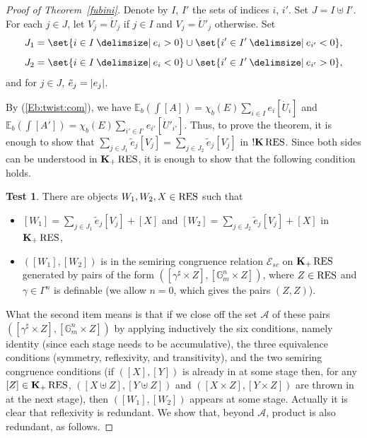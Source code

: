 \documentclass[12pt]{amsart}
\theoremstyle{plain}
\theoremstyle{definition}
\newtheorem{test}[thm]{Test}
\theoremstyle{remark}
\numberwithin{equation}{section}
\theoremstyle{plain}
\newcommand{\G}{\mathds{G}}
\newcommand{\0}{\emptyset}
\DeclarePairedDelimiter\abs{\lvert}{\rvert}
\newcommand{\mdl}[1]{\mathcal{#1}}  %
\newcommand{\bb}[1]{\mathbb{#1}}
\providecommand\given{}
\newcommand\SetSymbol[1][]{%
\nonscript \: #1 \vert
\allowbreak
\nonscript\:
\mathopen{}}
\renewcommand\given{\SetSymbol[\delimsize]}
\newcommand{\RES}{\textup{RES}}
\DeclareMathOperator{\gsk}{\mathbf{K}_+}
\DeclareMathOperator{\ggk}{\mathbf{K}}
\DeclareMathOperator{\sggk}{!\mathbf{K}}
\begin{document}
\begin{proof}[Proof of Theorem~\ref{fubini}]

Denote by $I$, $I'$ the sets of indices $i$, $i'$. Set $J = I \uplus I'$. For each $j\in J$, let $V_j=\dot U_j$ if $j\in I$ and $V_j=\dot U'_j$ otherwise. Set
\[
J_1=\set{i\in I \given e_i>0} \cup \set{i'\in I' \given e_{i'}<0},
\]
\[
J_2=\set{i\in I \given e_i<0}\cup \set{i'\in I'  \given e_{i'}>0},
\]
and for $j\in J$, $\tilde e_j = \abs{e_j}$.

By (\ref{Eb:twist:com}), we have $\bb E_b (\int [A] ) = \chi_b(E) \sum_{i\in I} e_i [\dot U_i]$ and $\bb E_b ( \int [A'] ) = \chi_b(E) \sum_{i'\in I'} e_{i'} [\dot U'_{i'}]$. Thus, to prove the theorem, it is enough to show that $\sum_{j\in J_1} \tilde e_j [V_j]=\sum_{j\in J_2} \tilde e_j [V_j]$ in $\sggk \RES$.  Since both sides can be understood in $\gsk \RES$, it is enough to show that the following condition holds.

\begin{test}\label{test}
There are objects $W_1, W_2, X \in \RES$ such that
\begin{itemize}
  \item $[W_1] = \sum_{j\in J_1} \tilde e_j [V_j] + [X]$ and $[W_2] = \sum_{j\in J_2} \tilde e_j [V_j] + [X]$ in $\gsk \RES$,
  \item $([W_1], [W_2])$ is in the semiring congruence relation $\mdl E_{sc}$ on $\gsk \RES$ generated by pairs of the form $([\gamma^\sharp \times Z], [\G_{m}^n \times Z])$, where $Z \in \RES$ and $\gamma \in \Gamma^n$ is definable (we allow $n = 0$, which gives the pairs $(Z, Z)$).
\end{itemize}
\end{test}

What the second item means is that  if we close off the set $\mdl A$ of these pairs $([\gamma^\sharp \times Z], [\G_{m}^n \times Z])$ by applying inductively the six conditions, namely identity (since each stage needs to be accumulative), the three equivalence conditions (symmetry, reflexivity, and transitivity), and the two semiring congruence conditions (if $([X], [Y])$ is already in at some stage then, for any $[Z] \in \gsk \RES$, $([X \uplus Z], [Y \uplus Z])$ and  $([X \times Z], [Y \times Z])$ are thrown in at the next stage), then $([W_1], [W_2])$ appears at some stage. Actually it is clear that reflexivity is redundant. We show that, beyond $\mdl A$, product is also redundant, as follows.


\end{proof}
\end{document}
